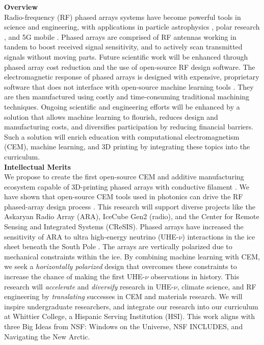 \documentclass[11pt]{amsart}
\begin{document}

\noindent \textbf{Overview} \\ \noindent Radio-frequency (RF) phased arrays systems have become powerful tools in science and engineering, with applications in particle astrophysics \cite{Vieregg_2016,AVVA201746,electronics10040415,rno}, polar research \cite{arnold_2020,9670670}, and 5G mobile \cite{5G_review_paper}.  Phased arrays are comprised of RF antennas working in tandem to boost received signal sensitivity, and to actively scan transmitted signals without moving parts.  Future scientific work will be enhanced through phased array cost reduction and the use of open-source RF design software.  The electromagnetic response of phased arrays is designed with expensive, proprietary software that does not interface with open-source machine learning tools \cite{10.3390/electronics8121506}.  They are then manufactured using costly and time-consuming traditional machining techniques.  Ongoing scientific and engineering efforts will be enhanced by a solution that allows machine learning to flourish, reduces design and manufacturing costs, and diversifies participation by reducing financial barriers.  Such a solution will enrich education with computational electromagnetism (CEM), machine learning, and 3D printing by integrating these topics into the curriculum. \\

\noindent \textbf{Intellectual Merits} \\ \noindent We propose to create the first open-source CEM and additive manufacturing ecosystem capable of 3D-printing phased arrays with conductive filament \cite{10.3390/electronics8121506, yurduseven,8786183}.  We have shown that open-source CEM tools used in photonics can drive the RF phased-array design process \cite{electronics10040415}.  This research will support diverse projects like the Askaryan Radio Array (ARA), IceCube Gen2 (radio), and the Center for Remote Sensing and Integrated Systems (CReSIS).  Phased arrays have increased the sensitivity of ARA to ultra high-energy neutrino (UHE-$\nu$) interactions in the ice sheet beneath the South Pole \cite{PhysRevD.105.122006}.  The arrays are vertically polarized due to mechanical constraints within the ice.  By combining machine learning with CEM, we seek a \textit{horizontally polarized} design that overcomes these constraints to increase the chance of making the first UHE-$\nu$ observations in history.  This research will \textit{accelerate} and \textit{diversify} research in UHE-$\nu$, climate science, and RF engineering by \textit{translating} successes in CEM and materials research.  We will inspire undergraduate researchers, and integrate our research into our curriculum at Whittier College, a Hispanic Serving Institution (HSI).  This work aligns with three Big Ideas from NSF: Windows on the Universe, NSF INCLUDES, and Navigating the New Arctic. \\
\end{document}
